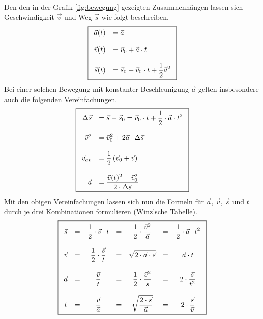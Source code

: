 \noindent
Den den in der Grafik \ref{fig:bewegung} gezeigten Zusammenhängen lassen
sich Geschwindigkeit $\vec{v}$ und Weg $\vec{s}$ wie folgt beschreiben.
\[ \boxed{\begin{array}{r l} 
	\vec{a}(t) 	&= \displaystyle
		\vec{a} \\
	& \\
	\vec{v}(t)	&= \displaystyle 
		\vec{v}_0+\vec{a}\cdot t \\
	& \\
	\vec{s}(t) 	&= \displaystyle 
		\vec{s}_0+\vec{v}_0\cdot t+\frac{1}{2}\vec{a}^{2}
\end{array}}\]
Bei einer solchen Bewegung mit konstanter Beschleunigung $\vec{a}$ gelten
insbesondere auch die folgenden Vereinfachungen.
\[ \boxed{\begin{array}{r l}
	\Delta \vec{s}	&= \displaystyle
		\vec{s}-\vec{s}_0 = \displaystyle
		\vec{v}_0\cdot t+\frac{1}{2}\cdot \vec{a}\cdot t^2 \\
	& \\
	\vec{v}^2 	&= \displaystyle
		\vec{v}_{0}^{2}+2\vec{a} \cdot \Delta \vec{s} \\
	& \\
	\vec{v}_{av} &= \displaystyle
		\frac{1}{2} \left( \vec{v}_0 + \vec{v} \right) \\
	& \\
	\vec{a} 	&= \displaystyle
		\frac{\vec{v}(t)^2-\vec{v}_0^2}{2\cdot\Delta \vec{s}} 
\end{array}}\]
Mit den obigen Vereinfachungen lassen sich nun die Formeln für 
$\vec{a}$, $\vec{v}$, $\vec{s}$ und $t$ durch je drei
Kombinationen formulieren (Winz'sche Tabelle).
\[ \boxed{\begin{array}{c c c c c c c}
	\vec{s}	
		&=& \displaystyle 
			\frac{1}{2} \cdot \vec{v} \cdot t
		&=& \displaystyle 
			\frac{1}{2} \cdot \frac{\vec{v}^2}{\vec{a}}
		&=& \displaystyle 
			\frac{1}{2} \cdot \vec{a} \cdot t^2 \\
	& & & & & & \\
	\vec{v} 
		&=& \displaystyle 
			\frac{1}{2} \cdot \frac{\vec{s}}{t}
		&=& \displaystyle 
			\sqrt{2 \cdot \vec{a} \cdot \vec{s}}
		&=& \displaystyle 
			\vec{a} \cdot t \\
	& & & & & & \\
	\vec{a}
		&=& \displaystyle 
			\frac{\vec{v}}{t} 
		&=& \displaystyle 
			\frac{1}{2} \cdot \frac{\vec{v}^2}{s}
		&=& \displaystyle 
			2 \cdot \frac{\vec{s}}{t^2} \\
	& & & & & & \\
	t 	
		&=& \displaystyle 
			\frac{\vec{v}}{\vec{a}}
		&=& \displaystyle 
			\sqrt{\frac{2 \cdot \vec{s}}{\vec{a}}}
		&=& \displaystyle 
			2 \cdot \frac{\vec{s}}{\vec{v}}
\end{array}}\]

